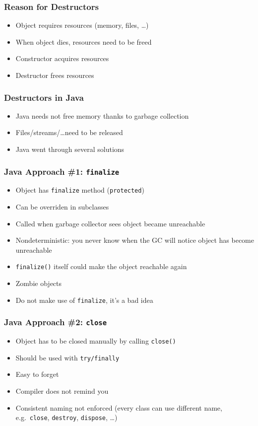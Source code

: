 \begin{frame}
  \frametitle{Reason for Destructors}
  \begin{itemize}
    \item Object requires resources (memory, files, \dots)
    \item When object dies, resources need to be freed
    \item Constructor acquires resources
    \item Destructor frees resources
  \end{itemize}
\end{frame}

\begin{frame}
  \frametitle{Destructors in Java}
  \begin{itemize}
    \item Java needs not free memory thanks to garbage collection
    \item Files/streams/\dots need to be released
    \item Java went through several solutions
  \end{itemize}
\end{frame}

\begin{frame}
  \frametitle{Java Approach \#1: {\tt finalize}}
  \begin{itemize}
    \item Object has {\tt finalize} method ({\tt protected})
    \item Can be overriden in subclasses
    \item Called when garbage collector sees object became unreachable
  \end{itemize}
  \vskip5mm
  \begin{itemize}
    \item Nondeterministic: you never know when the GC will notice object has become unreachable
    \item {\tt finalize()} itself could make the object reachable again
    \item Zombie objects
    \item Do not make use of {\tt finalize}, it's a bad idea
  \end{itemize}
\end{frame}

\begin{frame}
  \frametitle{Java Approach \#2: {\tt close}}
  \begin{itemize}
    \item Object has to be closed manually by calling {\tt close()}
    \item Should be used with {\tt try/finally}
  \end{itemize}
  \vskip5mm
  \begin{itemize}
    \item Easy to forget
    \item Compiler does not remind you
    \item Consistent naming not enforced (every class can use different name, e.g.\ {\tt close}, {\tt destroy}, {\tt dispose}, \dots)
  \end{itemize}
\end{frame}

